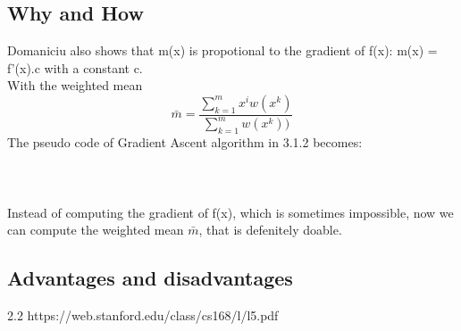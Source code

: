 \subsection{Why and How}
Domaniciu also shows that m(x) is propotional to the gradient of f(x): m(x) = f'(x).c with a constant c.\\ With the weighted mean \[\bar{m} = \frac{\sum_{k=1}^{m}x^i{w(x^k) }}{\sum_{k=1}^{m}{w(x^k) }) }\]The pseudo code of Gradient Ascent algorithm in 3.1.2 becomes:\\\\
\\\\Instead of computing the gradient of f(x), which is sometimes impossible, now we can compute the weighted mean $\bar{m}$, that is defenitely doable. 

\subsection{Advantages and disadvantages}

2.2 https://web.stanford.edu/class/cs168/l/l5.pdf